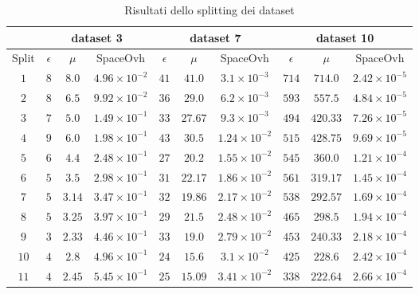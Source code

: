 \begin{center}
	\begin{table}
	\caption{Risultati dello splitting dei dataset}\label{tab:n1}
	\begin{center}
		\begin{tabular}{ c||ccc|ccc|ccc }
		\hline		
		\hline
		&\multicolumn{3}{c}{dataset 3}&\multicolumn{3}{c}{dataset 7}&\multicolumn{3}{c}{dataset 10} \\
		\hline
		Split & $\epsilon$ & $\mu$ & SpaceOvh & $\epsilon$ & $\mu$ & SpaceOvh & $\epsilon$ & $\mu$ & SpaceOvh\\ \hline
		\hline
$1$  & $8$ & $8.0$  & $4.96\times 10^{-2}$   & $41$ & $41.0$ & $3.1\times 10^{-3}$     & $714$ & $714.0$ & $2.42\times 10^{-5}$   \\ 
$2$  & $8$ & $6.5$  & $9.92\times 10^{-2}$   & $36$ & $29.0$ & $6.2\times 10^{-3}$     & $593$ & $557.5$ & $4.84\times 10^{-5}$   \\ 
$3$  & $7$ & $5.0$  & $1.49\times 10^{-1}$   & $33$ & $27.67$ & $9.3\times 10^{-3}$    & $494$ & $420.33$ & $7.26\times 10^{-5}$  \\ 
$4$  & $9$ & $6.0$  & $1.98\times 10^{-1}$   & $43$ & $30.5$ & $1.24\times 10^{-2}$    & $515$ & $428.75$ & $9.69\times 10^{-5}$  \\ 
$5$  & $6$ & $4.4$  & $2.48\times 10^{-1}$   & $27$ & $20.2$ & $1.55\times 10^{-2}$    & $545$ & $360.0$ & $1.21\times 10^{-4}$   \\ 
$6$  & $5$ & $3.5$  & $2.98\times 10^{-1}$   & $31$ & $22.17$ & $1.86\times 10^{-2}$   & $561$ & $319.17$ & $1.45\times 10^{-4}$  \\ 
$7$  & $5$ & $3.14$ & $3.47\times 10^{-1}$   & $32$ & $19.86$ & $2.17\times 10^{-2}$   & $538$ & $292.57$ & $1.69\times 10^{-4}$  \\ 
$8$  & $5$ & $3.25$ & $3.97\times 10^{-1}$   & $29$ & $21.5$ & $2.48\times 10^{-2}$    & $465$ & $298.5$ & $1.94\times 10^{-4}$   \\ 
$9$  & $3$ & $2.33$ & $4.46\times 10^{-1}$   & $33$ & $19.0$ & $2.79\times 10^{-2}$    & $453$ & $240.33$ & $2.18\times 10^{-4}$  \\ 
$10$ & $4$ & $2.8$  & $4.96\times 10^{-1}$   & $24$ & $15.6$ & $3.1\times 10^{-2}$     & $425$ & $228.6$ & $2.42\times 10^{-4}$   \\ 
$11$ & $4$ & $2.45$ & $5.45\times 10^{-1}$   & $25$ & $15.09$ & $3.41\times 10^{-2}$   & $338$ & $222.64$ & $2.66\times 10^{-4}$  \\ 

\end{tabular}
\end{center}
\end{table}
\end{center}
